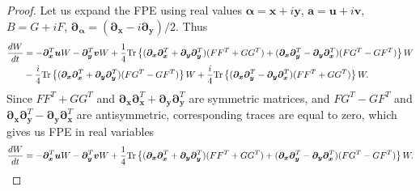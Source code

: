 \begin{proof}
Let us expand the FPE using real values
$\bm{\alpha} = \bm{x} + i \bm{y}$,
$\bm{a} = \bm{u} + i \bm{v}$,
$B = G + iF$,
$\bm{\partial}_{\bm{\alpha}} = (\bm{\partial}_{\bm{x}} - i \bm{\partial}_{\bm{y}}) / 2$.
Thus
\begin{equation*}
\begin{split}
	\frac{dW}{dt}
	& = - \bm{\partial}_{\bm{x}}^T \bm{u} W
	- \bm{\partial}_{\bm{y}}^T \bm{v} W
	+ \frac{1}{4} \mathrm{Tr} \left\{ 
		(\bm{\partial}_{\bm{x}} \bm{\partial}_{\bm{x}}^T
			+ \bm{\partial}_{\bm{y}} \bm{\partial}_{\bm{y}}^T)
		(F F^T + G G^T)
		+ (\bm{\partial}_{\bm{x}} \bm{\partial}_{\bm{y}}^T
			- \bm{\partial}_{\bm{y}} \bm{\partial}_{\bm{x}}^T)
		(F G^T - G F^T)
	 \right\} W \\
	& - \frac{i}{4} \mathrm{Tr} \left\{ 
		(\bm{\partial}_{\bm{x}} \bm{\partial}_{\bm{x}}^T
			+ \bm{\partial}_{\bm{y}} \bm{\partial}_{\bm{y}}^T)
		(F G^T - G F^T)
	 \right\} W
	+ \frac{i}{4} \mathrm{Tr} \left\{ 
		(\bm{\partial}_{\bm{x}} \bm{\partial}_{\bm{y}}^T
			- \bm{\partial}_{\bm{y}} \bm{\partial}_{\bm{x}}^T)
		(F F^T + G G^T)
	 \right\} W.
\end{split}
\end{equation*}
Since $F F^T + G G^T$ and $\bm{\partial}_{\bm{x}} \bm{\partial}_{\bm{x}}^T + \bm{\partial}_{\bm{y}} \bm{\partial}_{\bm{y}}^T$ are symmetric matrices,
and $F G^T - G F^T$ and $\bm{\partial}_{\bm{x}} \bm{\partial}_{\bm{y}}^T - \bm{\partial}_{\bm{y}} \bm{\partial}_{\bm{x}}^T$ are antisymmetric,
corresponding traces are equal to zero,
which gives us FPE in real variables
\[
	\frac{dW}{dt}
	= - \bm{\partial}_{\bm{x}}^T \bm{u} W
	- \bm{\partial}_{\bm{y}}^T \bm{v} W
	+ \frac{1}{4} \mathrm{Tr} \left\{ 
		(\bm{\partial}_{\bm{x}} \bm{\partial}_{\bm{x}}^T
			+ \bm{\partial}_{\bm{y}} \bm{\partial}_{\bm{y}}^T)
		(F F^T + G G^T)
		+ (\bm{\partial}_{\bm{x}} \bm{\partial}_{\bm{y}}^T
			- \bm{\partial}_{\bm{y}} \bm{\partial}_{\bm{x}}^T)
		(F G^T - G F^T)
	 \right\} W.
\]


\end{proof}
